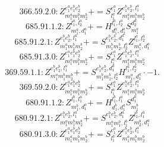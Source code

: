 \documentclass[letterpaper,10pt,fleqn,leqno,onecolumn]{article}
\begin{document}
\begin{equation} \;\;\;\;\;\;  366.59.2.0: Z^{e_{1}^{a}e_{1}^{b}e_{2}^{b}}_{m_{1}^{a}m_{1}^{b}m_{2}^{b}}+=S^{e_{1}^{a}}_{l_{1}^{a}}Z^{e_{1}^{b}e_{2}^{b},l_{1}^{a}}_{m_{1}^{a}m_{1}^{b}m_{2}^{b}} \end{equation}
\begin{equation} \;\;\;\;\;\;  685.91.1.2: Z^{l_{1}^{a},l_{2}^{a}}_{m_{1}^{a},d_{1}^{a}}+=H^{l_{1}^{a},l_{2}^{a}}_{d_{1}^{a},d_{2}^{a}}S^{d_{2}^{a}}_{m_{1}^{a}} \end{equation}
\begin{equation} \;\;\;\;\;\;  685.91.2.1: Z^{e_{1}^{b}e_{2}^{b},l_{1}^{a}}_{m_{1}^{a}m_{1}^{b}m_{2}^{b}}+=S^{e_{1}^{b}e_{2}^{b},d_{1}^{a}}_{m_{1}^{b}m_{2}^{b},l_{2}^{a}}Z^{l_{1}^{a},l_{2}^{a}}_{m_{1}^{a},d_{1}^{a}} \end{equation}
\begin{equation} \;\;\;\;\;\;  685.91.3.0: Z^{e_{1}^{a}e_{1}^{b}e_{2}^{b}}_{m_{1}^{a}m_{1}^{b}m_{2}^{b}}+=S^{e_{1}^{a}}_{l_{1}^{a}}Z^{e_{1}^{b}e_{2}^{b},l_{1}^{a}}_{m_{1}^{a}m_{1}^{b}m_{2}^{b}} \end{equation}
\begin{equation} \;\;\;\;\;\;  369.59.1.1: Z^{e_{1}^{b}e_{2}^{b},l_{1}^{a}}_{m_{1}^{a}m_{1}^{b}m_{2}^{b}}+=S^{e_{1}^{b}e_{2}^{b},d_{1}^{a}}_{m_{1}^{b}m_{2}^{b},l_{2}^{a}}H^{l_{1}^{a},l_{2}^{a}}_{m_{1}^{a},d_{1}^{a}}\cdot -1. \end{equation}
\begin{equation} \;\;\;\;\;\;  369.59.2.0: Z^{e_{1}^{a}e_{1}^{b}e_{2}^{b}}_{m_{1}^{a}m_{1}^{b}m_{2}^{b}}+=S^{e_{1}^{a}}_{l_{1}^{a}}Z^{e_{1}^{b}e_{2}^{b},l_{1}^{a}}_{m_{1}^{a}m_{1}^{b}m_{2}^{b}} \end{equation}
\begin{equation} \;\;\;\;\;\;  680.91.1.2: Z^{l_{1}^{b},l_{1}^{a}}_{m_{1}^{b},d_{1}^{a}}+=H^{l_{1}^{b},l_{1}^{a}}_{d_{1}^{b},d_{1}^{a}}S^{d_{1}^{b}}_{m_{1}^{b}} \end{equation}
\begin{equation} \;\;\;\;\;\;  680.91.2.1: Z^{e_{1}^{b}e_{2}^{b},l_{1}^{a}}_{m_{1}^{a}m_{1}^{b}m_{2}^{b}}+=S^{e_{1}^{b}e_{2}^{b},d_{1}^{a}}_{m_{1}^{a}m_{1}^{b},l_{1}^{b}}Z^{l_{1}^{b},l_{1}^{a}}_{m_{2}^{b},d_{1}^{a}} \end{equation}
\begin{equation} \;\;\;\;\;\;  680.91.3.0: Z^{e_{1}^{a}e_{1}^{b}e_{2}^{b}}_{m_{1}^{a}m_{1}^{b}m_{2}^{b}}+=S^{e_{1}^{a}}_{l_{1}^{a}}Z^{e_{1}^{b}e_{2}^{b},l_{1}^{a}}_{m_{1}^{a}m_{1}^{b}m_{2}^{b}} \end{equation}
\end{document}
